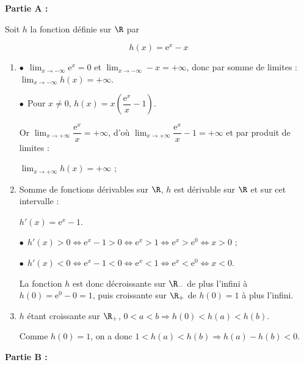 
\bigskip

\textbf{Partie A :}

\medskip

Soit $h$ la fonction définie sur $\R$ par

\[h(x) = \text{e}^x - x\]

\smallskip

\begin{enumerate}
\item %

$\bullet~~$$\displaystyle\lim_{x \to - \infty} \text{e}^x = 0$ et $\displaystyle\lim_{x \to - \infty} - x = + \infty$, donc par somme de limites : $\displaystyle\lim_{x \to - \infty} h(x) = + \infty$.

$\bullet~~$Pour $x \ne 0$, \: $h(x) = x\left(\dfrac{\text{e}^x}{x} - 1\right)$.

Or $\displaystyle\lim_{x \to + \infty} \dfrac{\text{e}^x}{x} = + \infty$, d'où $\displaystyle\lim_{x \to + \infty}\dfrac{\text{e}^x}{x} - 1 = + \infty$ et par produit de limites :

$\displaystyle\lim_{x \to + \infty} h(x) = + \infty$ ; 

\item %

Somme de fonctions dérivables sur $\R$, $h$ est dérivable sur $\R$ et sur cet intervalle :

$h'(x) =  \text{e}^x - 1$.

$\bullet~~$$h'(x) > 0 \iff \text{e}^x - 1 > 0 \iff \text{e}^x > 1 \iff \text{e}^x > \text{e}^0 \iff x > 0$ ;

$\bullet~~$$h'(x) < 0 \iff \text{e}^x - 1 < 0 \iff \text{e}^x < 1 \iff \text{e}^x < \text{e}^0 \iff x < 0$.

La fonction $h$ est donc décroissante sur $\R_{-}$ de plus l'infini à $h(0) = \text{e}^0 - 0 = 1$, puis croissante sur $\R_{+}$ de $h(0) = 1$ à plus l'infini.
\item %

$h$ étant croissante sur $\R_{+}$, \: $0 < a < b \Rightarrow h(0) < h(a) < h(b)$.

Comme $h(0) = 1$, on a donc $1 < h(a) < h(b) \Rightarrow h(a) - h(b) < 0$.
\end{enumerate}

\bigskip

\textbf{Partie B :}

